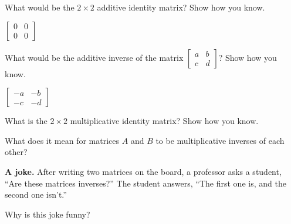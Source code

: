 \documentclass{ximera}
\begin{document}
\begin{question}
What would be the $2\times 2$ additive identity matrix?  Show how you know.  
\begin{freeResponse}
$\begin{bmatrix} 0&0 \\ 0&0 \end{bmatrix}$
\end{freeResponse}
\end{question}

\begin{question}
What would be the additive inverse of the matrix 
$\begin{bmatrix} a&b \\ c&d \end{bmatrix}$?  Show how you know.  
\begin{freeResponse}
$\begin{bmatrix} -a&-b \\ -c&-d \end{bmatrix}$
\end{freeResponse}
\end{question}

\begin{question}
What is the $2\times 2$ multiplicative identity matrix?  Show how you know.
\begin{freeResponse}
\end{freeResponse}
\end{question}

\begin{question}
What does it mean for matrices $A$ and $B$ to be multiplicative inverses of each other?  
\begin{freeResponse}
\end{freeResponse}
\end{question}

\textbf{A joke.}  After writing two matrices on the board, a professor asks a student, ``Are these matrices inverses?''  The student answers, ``The first one is, and the second one isn't.''  
\begin{question}
Why is this joke funny?  
\begin{freeResponse}
\end{freeResponse}
\end{question}
\end{document}

